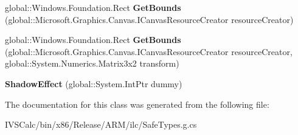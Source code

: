 \begin{DoxyCompactItemize}
\item 
\mbox{\label{class_microsoft_1_1_graphics_1_1_canvas_1_1_effects_1_1_shadow_effect_a74974b8df0482f01e4e4c8267d217afb}} 
global\+::\+Windows.\+Foundation.\+Rect {\bfseries Get\+Bounds} (global\+::\+Microsoft.\+Graphics.\+Canvas.\+I\+Canvas\+Resource\+Creator resource\+Creator)
\item 
\mbox{\label{class_microsoft_1_1_graphics_1_1_canvas_1_1_effects_1_1_shadow_effect_a9814bbd0429ff479d8ddd4998601c43d}} 
global\+::\+Windows.\+Foundation.\+Rect {\bfseries Get\+Bounds} (global\+::\+Microsoft.\+Graphics.\+Canvas.\+I\+Canvas\+Resource\+Creator resource\+Creator, global\+::\+System.\+Numerics.\+Matrix3x2 transform)
\item 
\mbox{\label{class_microsoft_1_1_graphics_1_1_canvas_1_1_effects_1_1_shadow_effect_a31ee829e7b76a3af6f36ea4b38c62c57}} 
{\bfseries Shadow\+Effect} (global\+::\+System.\+Int\+Ptr dummy)
\end{DoxyCompactItemize}


The documentation for this class was generated from the following file\+:\begin{DoxyCompactItemize}
\item 
I\+V\+S\+Calc/bin/x86/\+Release/\+A\+R\+M/ilc/Safe\+Types.\+g.\+cs\end{DoxyCompactItemize}
